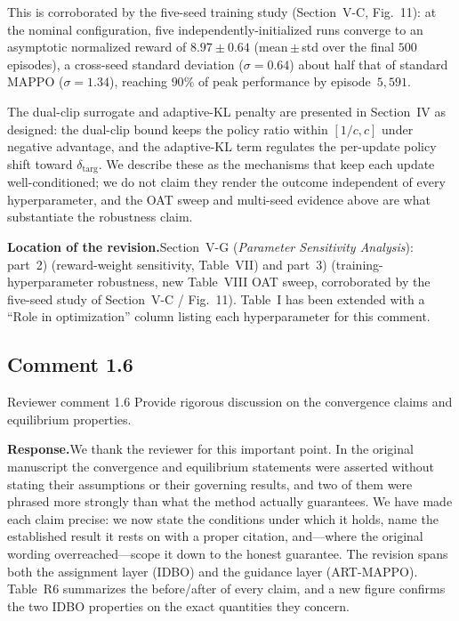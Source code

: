 \documentclass[11pt]{article}
\newcommand{\rsp}{\medskip\noindent\textbf{Response.}\quad}
\newcommand{\loc}{\medskip\noindent\textbf{Location of the revision.}\quad}
\begin{document}
\medskip\noindent This is corroborated by the five-seed training study (Section~V-C,
Fig.~11): at the nominal configuration, five independently-initialized runs converge to an
asymptotic normalized reward of $8.97\pm0.64$ (mean\,$\pm$\,std over the final $500$
episodes), a cross-seed standard deviation ($\sigma=0.64$) about half that of standard MAPPO
($\sigma=1.34$), reaching $90\%$ of peak performance by episode~$5{,}591$.

\medskip\noindent The dual-clip surrogate and adaptive-KL penalty are presented in
Section~IV as designed: the dual-clip bound keeps the policy ratio within
$[1/c,c]$ under negative advantage, and the adaptive-KL term regulates the per-update
policy shift toward $\delta_{\text{targ}}$. We describe these as the mechanisms that keep
each update well-conditioned; we do not claim they render the outcome independent of every
hyperparameter, and the OAT sweep and multi-seed evidence above are what substantiate the
robustness claim.

\loc Section~V-G (\emph{Parameter Sensitivity Analysis}): part~2) (reward-weight
sensitivity, Table~VII) and part~3) (training-hyperparameter robustness, new Table~VIII OAT
sweep, corroborated by the five-seed study of Section~V-C / Fig.~11). Table~I has been
extended with a ``Role in optimization'' column listing each hyperparameter for this comment.



\subsection*{Comment 1.6 }

\begin{reviewercomment}{Reviewer comment 1.6}
Provide rigorous discussion on the convergence claims and equilibrium properties.
\end{reviewercomment}

\rsp We thank the reviewer for this important point. In the original manuscript the
convergence and equilibrium statements were asserted without stating their assumptions or
their governing results, and two of them were phrased more strongly than what the method
actually guarantees. We have made each claim precise: we now state the conditions under
which it holds, name the established result it rests on with a proper citation, and---where
the original wording overreached---scope it down to the honest guarantee. The revision
spans both the assignment layer (IDBO) and the guidance layer (ART-MAPPO). Table~R6
summarizes the before/after of every claim, and a new figure confirms the two IDBO
properties on the exact quantities they concern.
\end{document}
